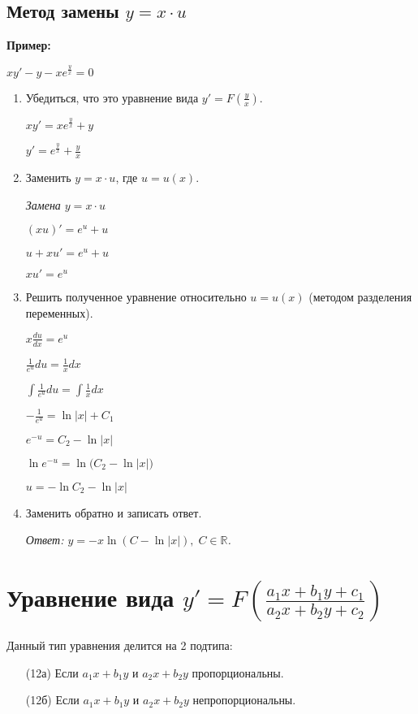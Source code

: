 \documentclass[10pt, a4paper]{article}
\begin{document}
\subsection{Метод замены $y = x \cdot u$}
\textbf{Пример:}
\par $xy' - y - xe^{\frac{y}{x}} = 0$
\begin{enumerate}
    \item Убедиться, что это уравнение вида $y' = F(\frac{y}{x})$.
        \par $xy' = xe^{\frac{y}{x}} + y$
        \par $y' = e^{\frac{y}{x}} + \frac{y}{x}$
    \item Заменить $y = x \cdot u$, где $u = u(x)$.
        \par\textit{Замена $y = x \cdot u$}
        \par $(xu)' = e^u + u$
        \par $u + xu' = e^u + u$
        \par $xu' = e^u$
    \item Решить полученное уравнение относительно $u = u(x)$ (методом разделения переменных).
        \par $x\frac{du}{dx} = e^u$
        \par $\frac{1}{e^u}du = \frac{1}{x}dx$
        \par $\int{\frac{1}{e^u}du} = \int{\frac{1}{x}dx}$
        \par $-\frac{1}{e^u} = \ln{|x|} + C_1$
        \par $e^{-u} = C_2 - \ln{|x|}$
        \par $\ln{e^{-u}} = \ln{(C_2 - \ln{|x|)}}$
        \par $u = -\ln{C_2 - \ln{|x|}}$
    \item Заменить обратно и записать ответ.
        \par\textit{Ответ: $y = -x\ln{(C - \ln{|x|})}, \; C \in \mathbb{R}$.}
\end{enumerate}


\section{Уравнение вида  $y' = F(\frac{a_1x + b_1y + c_1}{a_2x + b_2y + c_2})$}
Данный тип уравнения делится на 2 подтипа:
\begin{enumerate}
    \item[(12а)] Если $a_1x + b_1y$ и $a_2x + b_2y$ пропорциональны.
    \item[(12б)] Если $a_1x + b_1y$ и $a_2x + b_2y$ непропорциональны.
\end{enumerate}
\end{document}
